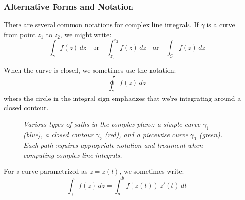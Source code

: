 \subsubsection*{Alternative Forms and Notation}

\noindent There are several common notations for complex line integrals. If $\gamma$ is a curve from point $z_1$ to $z_2$, we might write:
\[
\int_{\gamma} f(z) \, dz \quad \text{or} \quad \int_{z_1}^{z_2} f(z) \, dz \quad \text{or} \quad \int_{C} f(z) \, dz
\]

\noindent When the curve is closed, we sometimes use the notation:
\[
\oint_{\gamma} f(z) \, dz
\]
where the circle in the integral sign emphasizes that we're integrating around a closed contour.

\begin{figure}[H]
\centering
{}
\caption{\textit{Various types of paths in the complex plane: a simple curve $\gamma_1$ (blue), a closed contour $\gamma_2$ (red), and a piecewise curve $\gamma_3$ (green). Each path requires appropriate notation and treatment when computing complex line integrals.}}
\label{fig:integration-paths}
\end{figure}

\noindent For a curve parametrized as $z = z(t)$, we sometimes write:
\[
\int_{\gamma} f(z) \, dz = \int_a^b f(z(t)) \, z'(t) \, dt
\]

